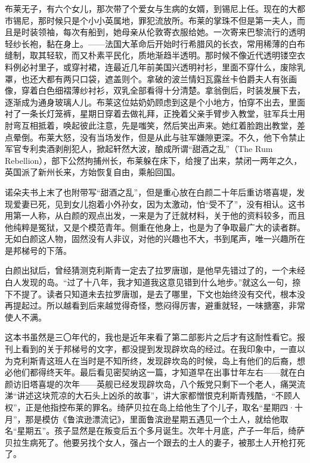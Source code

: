 \par 布莱无子，有六个女儿，那次带了个爱女与生病的女婿，到锡尼上任。现在的大都市锡尼，那时候只是个小小英属地，罪犯流放所。布莱的掌珠不但是第一夫人，而且是时装领袖，每次有船到，她母亲从伦敦寄衣服给她。一次寄来巴黎流行的透明轻纱长袍，黏在身上。——法国大革命后开始时行希腊风的长衣，常用稀薄的白布缝制，取其轻软，而又朴素平民化，质地渐趋半透明。那时候不像近代透明镂空衣料例必衬里子，或穿衬裙，连最近几年前美国兴透明衬衫，里面不穿什么，废除乳罩，也还大都有两只口袋，遮盖则个。拿破的波兰情妇瓦露丝卡伯爵夫人有张画像，穿着白色细褶薄纱衬衫，双乳全部看得十分清楚。拿翁倒后，时装发展下去，逐渐成为通身玻璃人儿。布莱这位姑奶奶顾虑到这是个小地方，怕穿不出去，里面衬了一条长灯笼裤，星期日穿着去做礼拜，正挽着父亲手臂步入教堂，驻军兵士用肘弯互相抵着，唤起彼此注意，先是嗤笑，然后笑出声来。她红着脸跑出教堂，差点晕倒。布莱大怒，没有当场发作，但是从此与驻军嫌隙更深。不久，他下令禁止军官专利卖酒剥削犯人，掀起轩然大波，酿成所谓“甜酒之乱”（The Rum Rebellion），部下公然拘捕州长，布莱躲在床下，给搜了出来，禁闭一两年之久，英国派了新州长来，方始恢复自由，乘船回国。
\par 诺朵夫书上末了也附带写“甜酒之乱”，但是重心放在白颜二十年后重访塔喜堤，发现爱妻已死，见到女儿抱着小外孙女，因为太激动，怕“受不了”，没有相认。这书用第一人称，从白颜的观点出发，一来是为了迁就材料，关于他的资料较多，而且他纯粹是冤狱，又是个模范青年。侧重在他身上，也是为了争取最广大的读者群。无如白颜这人物，固然没有人非议，对他的兴趣也不大，书到尾声，唯一兴趣所在是邦梯号的下落。
\par 白颜出狱后，曾经猜测克利斯青一定去了拉罗唐珈，是他早先错过了的，一个未经白人发现的岛。“过了十八年，我才知道我这意见错到什么地步。”就这么一句，捺下不提了。读者只知道未去拉罗唐珈，是去了哪里，下文也始终没有交代，根本没再提起过。所以越看到后来越觉得奇怪，憋闷得厉害，避重就轻，一味搪塞，非常使人不满。
\par 这本书虽然是三〇年代的，我也是近年来看了第二部影片之后才有这耐性看它。报刊上看到的关于邦梯号的文字，都没提到发现辟坎岛的经过。在我印象中，一直以为克利斯青这班人在当时是不知所终，发现辟坎岛的时候，岛上有他们的后裔，想必他们都得终天年。最后看见密契纳这一篇，才知道早在出事廿年左右——就在白颜访旧塔喜堤的次年——英舰已经发现辟坎岛，八个叛党只剩下一个老人，痛哭流涕“讲述这块荒凉的大石头上凶杀的故事”，讲大家都憎恨克利斯青残酷，“不顾人权”，正是他指控布莱的罪名。绮萨贝拉在岛上给他生了个儿子，取名“星期四·十月”，那是模仿《鲁滨逊漂流记》，里面鲁滨逊星期五遇见一个土人，就给他取名“星期五”。孩子显然是在叛变后五个多月诞生。次年十月底，产子一年后，绮萨贝拉生病死了。他要另找个女人，强占一个跟去的土人的妻子，被那土人开枪打死了。
